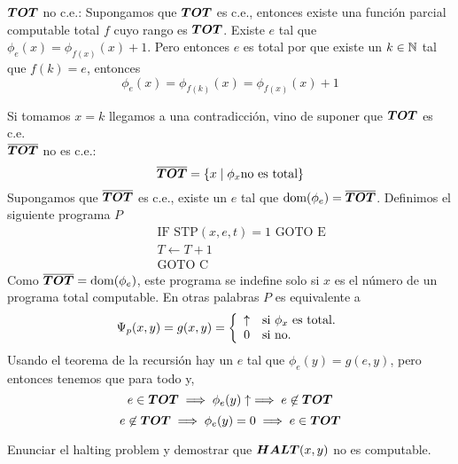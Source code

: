\documentclass[leqno, 12pt, twoside,letterpaper]{book}
\begin{document}
\begin{solucion}

$\bm{TOT}$ no c.e.: Supongamos que $\bm{TOT}$ es c.e., entonces existe una función parcial computable total $f$ cuyo rango es $\bm{TOT}$. Existe $e$ tal que $\phi_{e}(x) = \phi_{f(x)}(x) + 1$. Pero entonces $e$ es total por que existe un $k \in \mathbb{N}$ tal que $f(k) = e$, entonces
\[ \phi_{e}(x) = \phi_{f(k)}(x) = \phi_{f(x)}(x) + 1 \]

\noindent Si tomamos $x = k$ llegamos a una contradicción, vino de suponer que $\bm{TOT}$ es c.e. \\

\noindent $\bm{\overline{TOT}}$ no es c.e.: \[\bm{\overline{TOT}} = \{ x \mid \phi_x \mbox{no es total} \}\]
Supongamos que $\bm{\overline{TOT}}$ es c.e., existe un $e$ tal que $\mbox{dom}(\phi_{e}) = \bm{\overline{TOT}}$.
Definimos el siguiente programa $P$
\begin{align*}
	[C] \quad & \mbox{IF STP}(x, e, t) = 1 \mbox{ GOTO E} \\
		\quad & T \leftarrow T + 1 \\
		\quad & \mbox{GOTO C}
\end{align*}
\noindent Como $\bm{\overline{TOT}} = \mbox{dom}(\phi_e)$, este programa se indefine solo si $x$ es el número de un programa total computable. En otras palabras $P$ es equivalente a
\[ \Psi_{p}(x, y) = g(x, y) = \left\{ \begin{array}{ll} \uparrow & \mbox{si } \phi_x \mbox{ es total.} \\ 0 & \mbox{} \mbox{si no.} \end{array} \right.\]
\noindent Usando el teorema de la recursión hay un $e$ tal que $\phi_e(y) = g(e, y)$, pero entonces tenemos que para todo y,
 \[ e \in \bm{TOT} \implies  \phi_e(y) \uparrow \implies e \not\in \bm{TOT} \]
 \[ e \not\in \bm{TOT} \implies \phi_e(y) = 0 \implies e \in\bm{TOT} \]
\end{solucion}
\begin{ej}{3}
    Enunciar el halting problem y demostrar que $\bm{HALT}(x, y)$ no es computable.
\end{ej}
\end{document}
